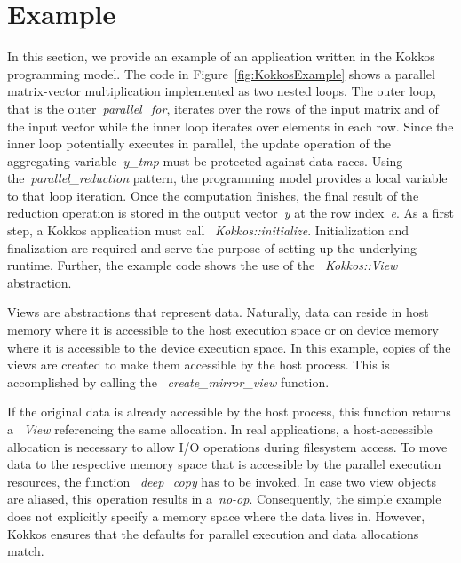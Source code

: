 \section{Example}\label{chap:kokkosExample}

In this section, we provide an example of an application written in the Kokkos programming model. The code in Figure~\ref{fig:KokkosExample} shows a parallel matrix-vector multiplication implemented as two nested loops. The outer loop, that is the outer~\emph{parallel\_for}, iterates over the rows of the input matrix and of the input vector while the inner loop iterates over elements in each row. Since the inner loop potentially executes in parallel, the update operation of the aggregating variable~\emph{y\_tmp} must be protected against data races. Using the~\emph{parallel\_reduction} pattern, the programming model provides a local variable to that loop iteration. Once the computation finishes, the final result of the reduction operation is stored in the output vector~\emph{y} at the row index~\emph{e}.  
As a first step, a Kokkos application must call ~\emph{Kokkos::initialize}. Initialization and finalization are required and serve the purpose of setting up the underlying runtime. 
Further, the example code shows the use of the ~\emph{Kokkos::View} abstraction. 

Views are abstractions that represent data. Naturally, data can reside in host memory where it is accessible to the host execution space or on device memory where it is accessible to the device execution space. In this example, copies of the views are created to make them accessible by the host process. This is accomplished by calling the ~\emph{create\_mirror\_view} function. 

If the original data is already accessible by the host process, this function returns a ~\emph{View} referencing the same allocation. In real applications, a host-accessible allocation is necessary to allow I/O operations during filesystem access. To move data to the respective memory space that is accessible by the parallel execution resources, the function ~\emph{deep\_copy} has to be invoked. In case two view objects are aliased, this operation results in a~\emph{no-op}. Consequently, the simple example does not explicitly specify a memory space where the data lives in. However, Kokkos ensures that the defaults for parallel execution and data allocations match. 

